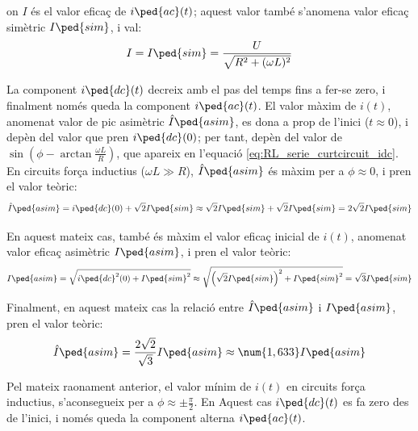 on $I$ és el valor eficaç de $i\ped{ac}(t)$; aquest valor també s'anomena valor eficaç simètric $I\ped{sim}$, i val:
\begin{equation}
    I = I\ped{sim} =\frac{U}{\sqrt{R^2+(\omega L)^2}}
    \label{eq:RL_serie_curtcircuit_I}
\end{equation}

La component $i\ped{dc}(t)$ decreix amb el pas del temps fins a fer-se zero, i finalment només queda la component $i\ped{ac}(t)$. El valor màxim de $i(t)$, anomenat valor de pic asimètric $\hat{I}\ped{asim}$, es dona a prop de l'inici ($t\approx 0$), i depèn del valor que pren $i\ped{dc}(0)$;  per tant, depèn del valor de $\sin\left(\phi - \arctan\frac{\omega L}{R}\right)$, que apareix en l'equació \eqref{eq:RL_serie_curtcircuit_idc}. En circuits força inductius ($\omega L\gg R$), $\hat{I}\ped{asim}$ és màxim per a $\phi \approx 0$, i pren el valor teòric:
\begin{equation}
    \hat{I}\ped{asim} = i\ped{dc}(0) + \sqrt{2} I\ped{sim} \approx \sqrt{2} I\ped{sim} +\sqrt{2} I\ped{sim} =2 \sqrt{2} I\ped{sim}    \label{eq:I_asim_pic}
\end{equation}


En aquest mateix cas, també és màxim el valor eficaç inicial de $i(t)$, anomenat valor eficaç asimètric $I\ped{asim}$,  i pren el valor teòric:
\begin{equation}
    I\ped{asim} = \sqrt{i\ped{dc}^2(0) + I\ped{sim}^2} \approx \sqrt{\left(\sqrt{2}I\ped{sim}\right)^2 + I\ped{sim}^2} = \sqrt{3} I\ped{sim} \label{eq:I_asim_eff}
\end{equation}

Finalment, en aquest mateix cas la relació entre $\hat{I}\ped{asim}$ i $I\ped{asim}$,   pren el valor teòric:
\begin{equation}
    \hat{I}\ped{asim} = \frac{2\sqrt{2}}{\sqrt{3}} I\ped{asim} \approx
    \num{1,633} I\ped{asim}
\end{equation}

Pel mateix raonament anterior, el valor mínim de $i(t)$ en circuits força inductius, s'aconsegueix per a $\phi \approx \pm\frac{\pi}{2}$. En Aquest cas $i\ped{dc}(t)$ es fa zero des de l'inici, i només queda la component alterna $i\ped{ac}(t)$.


